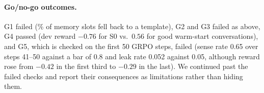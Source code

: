 \paragraph{Go/no-go outcomes.} G1 failed (\% of memory slots fell back to a template), G2 and G3 failed as above, G4 passed (dev reward $-0.76$ for S0 vs.\ $0.56$ for good warm-start conversations), and G5, which is checked on the first 50 GRPO steps, failed (sense rate 0.65 over steps 41--50 against a bar of 0.8 and leak rate 0.052 against 0.05, although reward rose from $-0.42$ in the first third to $-0.29$ in the last). We continued past the failed checks and report their consequences as limitations rather than hiding them.
